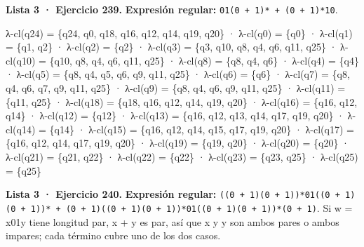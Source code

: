 \textbf{Lista 3 · Ejercicio 239.} \textbf{Expresión regular:} \texttt{01(0\ +\ 1)*\ +\ (0\ +\ 1)*10}.

λ-cl(q24) = \{q24, q0, q18, q16, q12, q14, q19, q20\} · λ-cl(q0) = \{q0\} · λ-cl(q1) = \{q1, q2\} · λ-cl(q2) = \{q2\} · λ-cl(q3) = \{q3, q10, q8, q4, q6, q11, q25\} · λ-cl(q10) = \{q10, q8, q4, q6, q11, q25\} · λ-cl(q8) = \{q8, q4, q6\} · λ-cl(q4) = \{q4\} · λ-cl(q5) = \{q8, q4, q5, q6, q9, q11, q25\} · λ-cl(q6) = \{q6\} · λ-cl(q7) = \{q8, q4, q6, q7, q9, q11, q25\} · λ-cl(q9) = \{q8, q4, q6, q9, q11, q25\} · λ-cl(q11) = \{q11, q25\} · λ-cl(q18) = \{q18, q16, q12, q14, q19, q20\} · λ-cl(q16) = \{q16, q12, q14\} · λ-cl(q12) = \{q12\} · λ-cl(q13) = \{q16, q12, q13, q14, q17, q19, q20\} · λ-cl(q14) = \{q14\} · λ-cl(q15) = \{q16, q12, q14, q15, q17, q19, q20\} · λ-cl(q17) = \{q16, q12, q14, q17, q19, q20\} · λ-cl(q19) = \{q19, q20\} · λ-cl(q20) = \{q20\} · λ-cl(q21) = \{q21, q22\} · λ-cl(q22) = \{q22\} · λ-cl(q23) = \{q23, q25\} · λ-cl(q25) = \{q25\}

\textbf{Lista 3 · Ejercicio 240.} \textbf{Expresión regular:} \texttt{((0\ +\ 1)(0\ +\ 1))*01((0\ +\ 1)(0\ +\ 1))*\ +\ (0\ +\ 1)((0\ +\ 1)(0\ +\ 1))*01((0\ +\ 1)(0\ +\ 1))*(0\ +\ 1)}. Si w = x01y tiene longitud par, \textbar x\textbar{} + \textbar y\textbar{} es par, así que \textbar x\textbar{} y \textbar y\textbar{} son ambos pares o ambos impares; cada término cubre uno de los dos casos.


